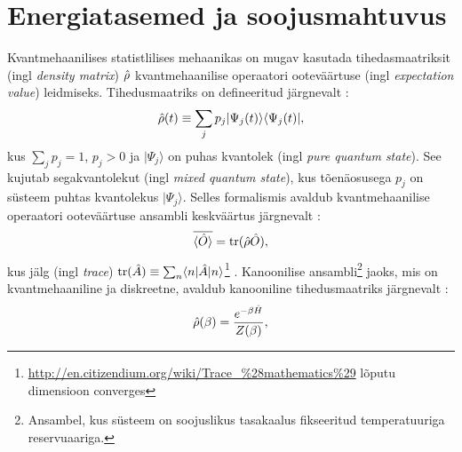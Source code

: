 \documentclass{trkut}%
\DeclareMathOperator{\tr}{tr}
\renewcommand\bra[1]{{\langle{#1}|}}
\renewcommand\ket[1]{{|{#1}\rangle}}
\renewcommand\braket[1]{\langle{#1}\rangle}
\begin{document}
%

\section{Energiatasemed ja soojusmahtuvus}
Kvantmehaanilises statistlilises mehaanikas on mugav kasutada tihedasmaatriksit (ingl \textit{density matrix}) $\op{\rho}$ kvantmehaanilise operaatori ooteväärtuse (ingl \textit{expectation value}) leidmiseks.
Tihedusmaatriks on defineeritud järgnevalt \parencite[172]{kardar07}:
\begin{equation}
    \op{\rho}(t) \equiv \sum_j p_j \ket{\Psi_j(t)} \bra{\Psi_j(t)},
\end{equation}
kus $\sum_j p_j=1$, $p_j > 0$ ja $\ket{\Psi_j}$ on puhas kvantolek (ingl \textit{pure quantum state}).
See kujutab segakvantolekut (ingl \textit{mixed quantum state}), kus tõenäosusega $p_j$ on süsteem puhtas kvantolekus $\ket{\Psi_j}$.
Selles formalismis avaldub kvantmehaanilise operaatori ooteväärtuse ansambli keskväärtus järgnevalt \parencite[172]{kardar07}:
\begin{equation}
    \overline{\braket{\op{O}}}=\tr(\op{\rho}\op{O}),
    \label{ootev}
\end{equation}
kus jälg (ingl \textit{trace}) $\tr(\op{A}) \equiv \sum_n \braket{n|\op{A}|n}$\footnote{\url{http://en.citizendium.org/wiki/Trace_\%28mathematics\%29} lõputu dimensioon converges} \parencite{viide}. %
Kanoonilise ansambli\footnote{Ansambel, kus süsteem on soojuslikus tasakaalus fikseeritud temperatuuriga reservuaariga.} jaoks, mis on kvantmehaaniline ja diskreetne, avaldub kanooniline tihedusmaatriks järgnevalt \parencite[174]{kardar07}:
\begin{equation}
    \op{\rho}(\beta) = \frac{e^{-\beta \op{H}}}{Z(\beta)},
    \label{tihm}
\end{equation}
\end{document}
